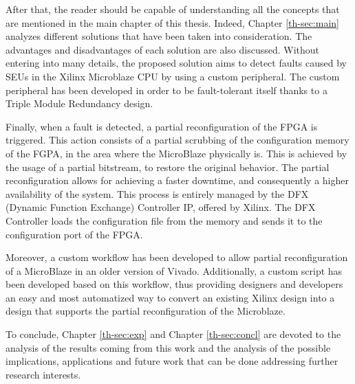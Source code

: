 After that, the reader should be capable of understanding all the concepts that are mentioned in the main chapter of this thesis. Indeed, Chapter \ref{th-sec:main} analyzes different solutions that have been taken into consideration. The advantages and disadvantages of each solution are also discussed. Without entering into many details, the proposed solution aims to detect faults caused by SEUs in the Xilinx Microblaze CPU by using a custom peripheral. The custom peripheral has been developed in order to be fault-tolerant itself thanks to a Triple Module Redundancy design.\bigskip

Finally, when a fault is detected, a partial reconfiguration of the FPGA is triggered. This action consists of a partial scrubbing of the configuration memory of the FGPA, in the area where the MicroBlaze physically is. This is achieved by the usage of a partial bitstream, to restore the original behavior. The partial reconfiguration allows for achieving a faster downtime, and consequently a higher availability of the system. This process is entirely managed by the DFX (Dynamic Function Exchange) Controller IP, offered by Xilinx. The DFX Controller loads the configuration file from the memory and sends it to the configuration port of the FPGA. \bigskip

Moreover, a custom workflow has been developed to allow partial reconfiguration of a MicroBlaze in an older version of Vivado. Additionally, a custom script has been developed based on this workflow, thus providing designers and developers an easy and most automatized way to convert an existing Xilinx design into a design that supports the partial reconfiguration of the Microblaze.\bigskip

To conclude, Chapter \ref{th-sec:exp} and Chapter \ref{th-sec:concl} are devoted to the analysis of the results coming from this work and the analysis of the possible implications, applications and future work that can be done addressing further research interests.

